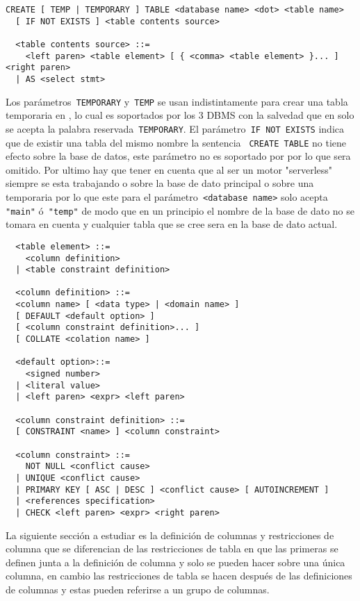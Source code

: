 \begin{Verbatim}[frame=leftline, framesep=3mm]
  CREATE [ TEMP | TEMPORARY ] TABLE <database name> <dot> <table name> 
  [ IF NOT EXISTS ] <table contents source>

  <table contents source> ::=
    <left paren> <table element> [ { <comma> <table element> }... ] <right paren>
  | AS <select stmt>
\end{Verbatim}

Los parámetros\verb= TEMPORARY= y\verb= TEMP= se usan indistintamente para crear una tabla temporaria en \s, lo cual es soportados por los 3 DBMS con la salvedad que en \m solo se acepta la palabra reservada\verb= TEMPORARY=. El parámetro\verb= IF NOT EXISTS= indica que de existir una tabla del mismo nombre la sentencia \verb= CREATE TABLE= no tiene efecto sobre la base de datos, este parámetro no es soportado por \p por lo que sera omitido. Por ultimo hay que tener en cuenta que al ser \s un motor "serverless" siempre se esta trabajando o sobre la base de dato principal o sobre una temporaria por lo que este para el parámetro\verb= <database name>= solo acepta\verb= "main"= ó\verb= "temp"= de modo que en un principio el nombre de la base de dato no se tomara en cuenta y cualquier tabla que se cree sera en la base de dato actual.

\begin{Verbatim}
  <table element> ::=
    <column definition>
  | <table constraint definition>

  <column definition> ::=
  <column name> [ <data type> | <domain name> ]
  [ DEFAULT <default option> ]
  [ <column constraint definition>... ]
  [ COLLATE <colation name> ]

  <default option>::=
    <signed number>
  | <literal value>
  | <left paren> <expr> <left paren>
  
  <column constraint definition> ::=
  [ CONSTRAINT <name> ] <column constraint>

  <column constraint> ::=
    NOT NULL <conflict cause>
  | UNIQUE <conflict cause>
  | PRIMARY KEY [ ASC | DESC ] <conflict cause> [ AUTOINCREMENT ]
  | <references specification>
  | CHECK <left paren> <expr> <right paren>
\end{Verbatim}

La siguiente sección a estudiar es la definición de columnas y restricciones de columna que se diferencian de las restricciones de tabla en que las primeras se definen junta a la definición de columna y solo se pueden hacer sobre una única columna, en cambio las restricciones de tabla se hacen después de las definiciones de columnas y estas pueden referirse a un grupo de columnas.\\

